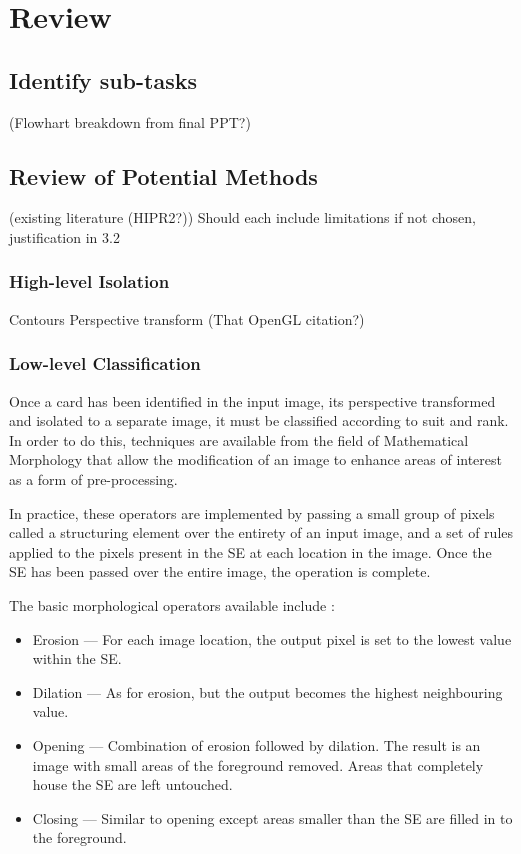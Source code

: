\documentclass[a4paper,12pt,notitlepage]{article}
\begin{document}
\section{Review}
	\subsection{Identify sub-tasks}
		(Flowhart breakdown from final PPT?)
	\subsection{Review of Potential Methods}
		(existing literature (HIPR2?))
		Should each include limitations if not chosen, justification in 3.2
		\subsubsection{High-level Isolation}
			Contours
			Perspective transform (That OpenGL citation?)
		\subsubsection{Low-level Classification}
			Once a card has been identified in the input image, its perspective transformed and isolated to a separate image, it must be classified according to suit and rank. In order to do this, techniques are available from the field of Mathematical Morphology that allow the modification of an image to enhance areas of interest as a form of pre-processing.

			In practice, these operators are implemented by passing a small group of pixels called a structuring element over the entirety of an input image, and a set of rules applied to the pixels present in the SE at each location in the image. Once the SE has been passed over the entire image, the operation is complete.

			The basic morphological operators available include \autocite{sonka1999image1}:

			\begin{itemize}
				\item Erosion --- For each image location, the output pixel is set to the lowest value within the SE.
				\item Dilation --- As for erosion, but the output becomes the highest neighbouring value. 
				\item Opening --- Combination of erosion followed by dilation. The result is an image with small areas of the foreground removed. Areas that completely house the SE are left untouched.
				\item Closing --- Similar to opening except areas smaller than the SE are filled in to the foreground.
			\end{itemize}
\end{document}
